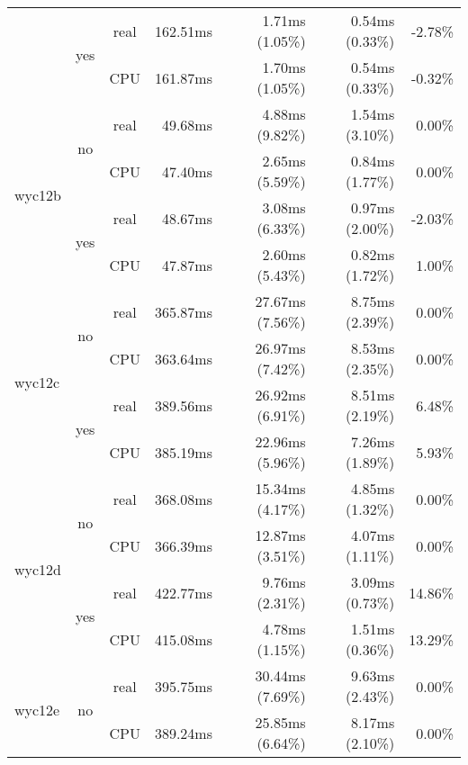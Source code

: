 \documentclass[en]{pracamgr}
\begin{document}
\begin{appendices}
\begin{small}
\begin{longtable}{|l|c|c|r|r|r|r|}
                          \cline{2-7}
                          & \multirow{2}{*}{yes} & real & 162.51ms & 1.71ms (1.05\%) & 0.54ms (0.33\%) & -2.78\% \\*
                          &                      & CPU  & 161.87ms & 1.70ms (1.05\%) & 0.54ms (0.33\%) & -0.32\% \\
\hline
\multirow{4}{*}{wyc12b}   & \multirow{2}{*}{no}  & real & 49.68ms & 4.88ms (9.82\%) & 1.54ms (3.10\%) & 0.00\% \\*
                          &                      & CPU  & 47.40ms & 2.65ms (5.59\%) & 0.84ms (1.77\%) & 0.00\% \\*
                          \cline{2-7}
                          & \multirow{2}{*}{yes} & real & 48.67ms & 3.08ms (6.33\%) & 0.97ms (2.00\%) & -2.03\% \\*
                          &                      & CPU  & 47.87ms & 2.60ms (5.43\%) & 0.82ms (1.72\%) & 1.00\% \\
\hline
\multirow{4}{*}{wyc12c}   & \multirow{2}{*}{no}  & real & 365.87ms & 27.67ms (7.56\%) & 8.75ms (2.39\%) & 0.00\% \\*
                          &                      & CPU  & 363.64ms & 26.97ms (7.42\%) & 8.53ms (2.35\%) & 0.00\% \\*
                          \cline{2-7}
                          & \multirow{2}{*}{yes} & real & 389.56ms & 26.92ms (6.91\%) & 8.51ms (2.19\%) & 6.48\% \\*
                          &                      & CPU  & 385.19ms & 22.96ms (5.96\%) & 7.26ms (1.89\%) & 5.93\% \\
\hline
\multirow{4}{*}{wyc12d}   & \multirow{2}{*}{no}  & real & 368.08ms & 15.34ms (4.17\%) & 4.85ms (1.32\%) & 0.00\% \\*
                          &                      & CPU  & 366.39ms & 12.87ms (3.51\%) & 4.07ms (1.11\%) & 0.00\% \\*
                          \cline{2-7}
                          & \multirow{2}{*}{yes} & real & 422.77ms & 9.76ms (2.31\%) & 3.09ms (0.73\%) & 14.86\% \\*
                          &                      & CPU  & 415.08ms & 4.78ms (1.15\%) & 1.51ms (0.36\%) & 13.29\% \\
\hline
\multirow{4}{*}{wyc12e}   & \multirow{2}{*}{no}  & real & 395.75ms & 30.44ms (7.69\%) & 9.63ms (2.43\%) & 0.00\% \\*
                          &                      & CPU  & 389.24ms & 25.85ms (6.64\%) & 8.17ms (2.10\%) & 0.00\% \\*

\end{longtable}
\end{small}
\end{appendices}
\end{document}
